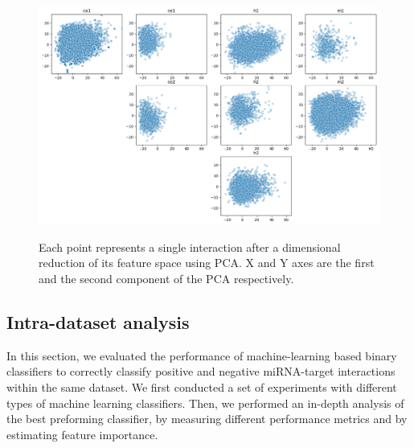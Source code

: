 \documentclass{bmcart}
\begin{document}

\begin{figure}[h!]
  \caption{ Each point represents a single interaction after a dimensional reduction of its feature space using PCA. X and Y axes are the first and the second component of the PCA respectively.}
       \includegraphics[width = 1\textwidth]{Results/features_pca_with_resample.png}
      \label{fig:feature_pca}
      \end{figure}


\subsection*{Intra-dataset analysis} \label{nameref:indataset}
In this section, we evaluated the performance of machine-learning based binary classifiers to correctly classify positive and negative miRNA-target interactions within the same dataset. 
We first conducted a set of experiments with different types of machine learning classifiers. Then, we performed an in-depth analysis of the best preforming classifier, by measuring different performance metrics and by estimating feature importance.
\end{document}
